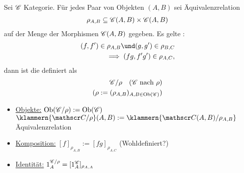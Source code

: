 \begin{definition}\enter
	Sei $\mathscr C$ Kategorie. Für jedes Paar von Objekten $(A,B)$ sei Äquivalenzrelation
	\begin{align*}
		\rho_{A,B} \subseteq \mathscr C(A,B) \times \mathscr C(A,B)
	\end{align*}
	auf der Menge der Morphismen $\mathscr C(A,B)$ gegeben. Es gelte :
	\begin{align*}
		(f,f') \in \rho_{A,B} \und (g,g') \in \rho_{B,C}\\
		\implies (fg,f' g') \in \rho_{A,C},
	\end{align*}
	dann ist die  definiert als
	\begin{align*}
		\mathscr C \slash \rho \quad (\mathscr C\text{ nach } \rho)\\
		(\rho:= (\rho_{A,B})_{A,B \in \operatorname{Ob}(\mathscr C)})
	\end{align*}
	\begin{itemize}
		\item \ul{Objekte:} $\operatorname{Ob}(\mathscr C \slash \rho) := \operatorname{Ob}(\mathscr C)$\\
		$\klammern{\lnkset{\Cat}{\rho}}(A,B) := \klammern{\lnkset{\Cat(A,B)}{\rho_{A,B}}}\quad$ Äquivalenzrelation
		\item \ul{Komposition:} $[f]_{\rho_{A,B}} := [fg]_{\rho_{A,C}}$ (Wohldefiniert?)
		\item \ul{Identität:} $1_{A}^{\mathscr C \slash \rho} = [1_A^{\mathscr C}]_{\rho_{A,A}}$
	\end{itemize}
\end{definition}
